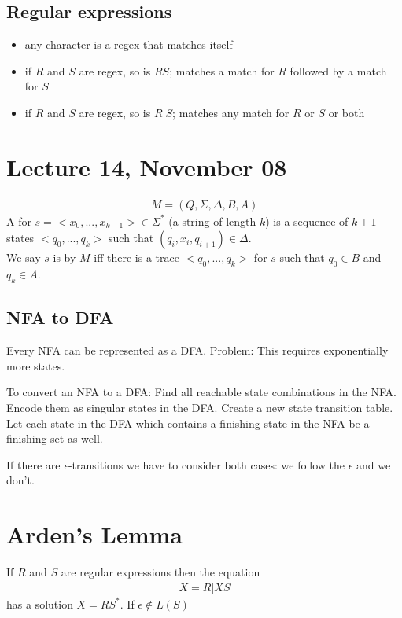 \documentclass{article}
\begin{document}
\subsection{Regular expressions}
\begin{definition}
    \begin{itemize}
        \item any character is a regex that matches itself
        \item if $R$ and $S$ are regex, so is $RS$; matches a match for $R$ followed by a match for $S$
        \item if $R$ and $S$ are regex, so is $R|S$; matches any match for $R$ or $S$ or both
    \end{itemize}
\end{definition}
\section{Lecture 14, November 08}
\begin{definition}
    \begin{align*}
        M=(Q,\Sigma, \Delta, B, A)
    \end{align*}
    A  for $s=<x_0,..., x_{k-1}>\in \Sigma^*$ (a string of length $k$) is a sequence of $k+1$ states $<q_0, ..., q_k>$ such that $(q_i, x_i, q_{i+1})\in\Delta$.\\
    We say $s$ is  by $M$ iff there is a trace $<q_0, ..., q_k>$ for $s$ such that $q_0\in B$ and $q_k\in A$.
\end{definition}
\subsection{NFA to DFA}
Every NFA can be represented as a DFA. Problem: This requires exponentially more states.
\begin{example}
    To convert an NFA to a DFA: Find all reachable state combinations in the NFA. Encode them as singular states in the DFA. Create a new state transition table. Let each state in the DFA which contains a finishing state in the NFA be a finishing set as well.
\end{example}
If there are $\epsilon$-transitions we have to consider both cases: we follow the $\epsilon$ and we don't.
\section{Arden's Lemma}
\begin{theorem}
    If $R$ and $S$ are regular expressions then the equation\begin{align*}
        X = R | X S
    \end{align*}
    has a solution $X = R S^*$. If $\epsilon\not\in L(S)$ 
\end{theorem}
\end{document}
